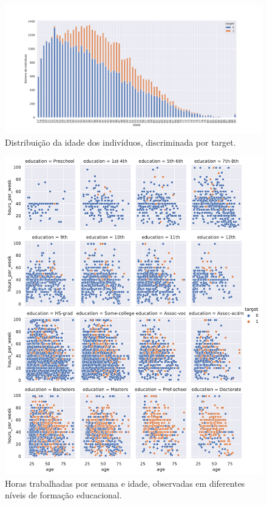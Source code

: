 \documentclass[a4paper, 12pt]{article}
\begin{document}
\begin{figure}[H]
    \begin{center}
        \includegraphics[width=\textwidth]{age.pdf}
    \end{center}
    \caption{Distribuição da idade dos indivíduos, discriminada por target.}
    \label{fig: age}
\end{figure}
\newpage
\begin{figure}[H]
    \begin{center}
        \includegraphics[width=\textwidth]{hours_age_by_ed.pdf}
    \end{center}
    \caption{Horas trabalhadas por semana e idade, observadas em diferentes níveis de formação educacional.}
    \label{fig: hours age ed}
\end{figure}

\printbibliography
\end{document}
